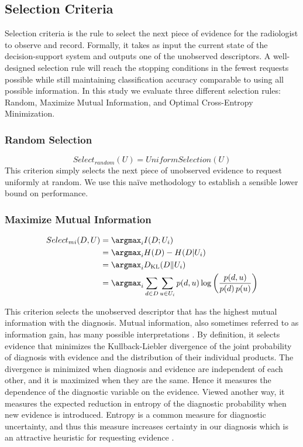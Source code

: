 \subsection{Selection Criteria}
Selection criteria is the rule to select the next piece of evidence for the radiologist to observe and record. Formally, it takes as input the current state of the decision-support system and outputs one of the unobserved descriptors. A well-designed selection rule will reach the stopping conditions in the fewest requests possible while still maintaining classification accuracy comparable to using all possible information. In this study we evaluate three different selection rules: Random, Maximize Mutual Information, and Optimal Cross-Entropy Minimization.

\subsubsection{Random Selection}
\begin{equation}
Select_{random}(U) = UniformSelection(U)
\end{equation}
This criterion simply selects the next piece of unobserved evidence to request uniformly at random. We use this naïve methodology to establish a sensible lower bound on performance. 

\subsubsection{Maximize Mutual Information}
\begin{align*}
Select_{mi}(D, U) &= \argmax_{i} I(D; U_i) \\
&= \argmax_{i} H(D)-H(D|U_i) \\
&= \argmax_{i} D_{\mathrm{KL}}(D\|U_i) \\
&= \argmax_{i} \sum_{d \in D} \sum_{u \in U_i} p(d,u) \log{ \left(\frac{p(d,u)}{p(d)\,p(u)}\right)}
\end{align*}

This criterion selects the unobserved descriptor that has the highest mutual information with the diagnosis. Mutual information, also sometimes referred to as information gain, has many possible interpretations \cite{Gray:2011hl}. By definition, it selects evidence that minimizes the Kullback-Liebler divergence of the joint probability of diagnosis with evidence and the distribution of their individual products. The divergence is minimized when diagnosis and evidence are independent of each other, and it is maximized when they are the same. Hence it measures the dependence of the diagnostic variable on the evidence. Viewed another way, it measures the expected reduction in entropy of the diagnostic probability when new evidence is introduced. Entropy is a common measure for diagnostic uncertainty, and thus this measure increases certainty in our diagnosis which is an attractive heuristic for requesting evidence \cite{MacKay:2003wc}.



